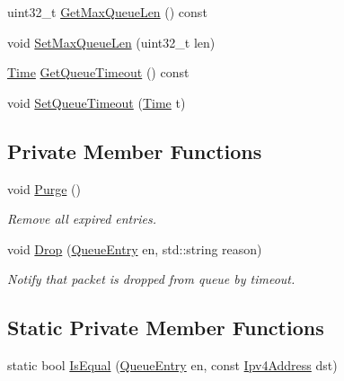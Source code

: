 \begin{DoxyCompactItemize}
uint32\+\_\+t \hyperlink{classns3_1_1aodv_1_1RequestQueue_a37817b918ae1ffd1c346898ab0b02eef}{Get\+Max\+Queue\+Len} () const 
\item 
void \hyperlink{classns3_1_1aodv_1_1RequestQueue_a4a71c31d25dfe0f97e970938076c00c5}{Set\+Max\+Queue\+Len} (uint32\+\_\+t len)
\item 
\hyperlink{classns3_1_1Time}{Time} \hyperlink{classns3_1_1aodv_1_1RequestQueue_aab629edc7ccd1daf4b98d5bbdfcbdf1d}{Get\+Queue\+Timeout} () const 
\item 
void \hyperlink{classns3_1_1aodv_1_1RequestQueue_a9f81ff4709cfe0f0e88438a820c308f7}{Set\+Queue\+Timeout} (\hyperlink{classns3_1_1Time}{Time} t)
\end{DoxyCompactItemize}
\subsection*{Private Member Functions}
\begin{DoxyCompactItemize}
\item 
void \hyperlink{classns3_1_1aodv_1_1RequestQueue_a6ed74cff072d572de14a87a5aaef2831}{Purge} ()
\begin{DoxyCompactList}\small\item\em Remove all expired entries. \end{DoxyCompactList}\item 
void \hyperlink{classns3_1_1aodv_1_1RequestQueue_af39cbe0d1f9ed4cbe14355b6a3b594e6}{Drop} (\hyperlink{classns3_1_1aodv_1_1QueueEntry}{Queue\+Entry} en, std\+::string reason)
\begin{DoxyCompactList}\small\item\em Notify that packet is dropped from queue by timeout. \end{DoxyCompactList}\end{DoxyCompactItemize}
\subsection*{Static Private Member Functions}
\begin{DoxyCompactItemize}
\item 
static bool \hyperlink{classns3_1_1aodv_1_1RequestQueue_a435a4bd8dd298a8387ba1a8ac4cdfe42}{Is\+Equal} (\hyperlink{classns3_1_1aodv_1_1QueueEntry}{Queue\+Entry} en, const \hyperlink{classns3_1_1Ipv4Address}{Ipv4\+Address} dst)
\end{DoxyCompactItemize}
